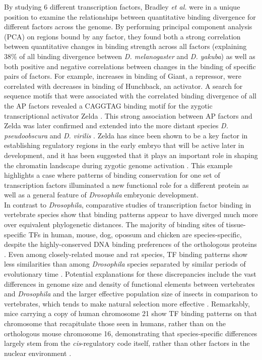 By studying 6 different transcription factors, Bradley \emph{et al.} were in a unique position to examine the relationships between quantitative binding divergence for different factors across the genome. By performing principal component analysis (PCA) on regions bound by any factor, they found both a strong correlation between quantitative changes in binding strength across all factors (explaining 38\% of all binding divergence between \emph{D. melanogaster} and \emph{D. yakuba}) as well as both positive and negative correlations between changes in the binding of specific pairs of factors. For example, increases in binding of Giant, a repressor, were correlated with decreases in binding of Hunchback, an activator. A search for sequence motifs that were associated with the correlated binding divergence of all the AP factors revealed a CAGGTAG binding motif for the zygotic transcriptional activator Zelda \citep{bradley_binding_2010}. This strong association between AP factors and Zelda was later confirmed and extended into the more distant species \emph{D. pseudoobscura} and \emph{D. virilis} \citep{paris_extensive_2013}. Zelda has since been shown to be a key factor in establishing regulatory regions in the early embryo that will be active later in development, and it has been suggested that it plays an important role in shaping the chromatin landscape during zygotic genome activation \citep{harrison_zelda_2011,satija_tagteam_2012}. This example highlights a case where patterns of binding conservation for one set of transcription factors illuminated a new functional role for a different protein as well as a general feature of \emph{Drosophila} embryonic development.\\

In contrast to \emph{Drosophila}, comparative studies of transcription factor binding in vertebrate species show that binding patterns appear to have diverged much more over equivalent phylogenetic distances. The majority of binding sites of tissue-specific TFs in human, mouse, dog, opossum and chicken are species-specific, despite the highly-conserved DNA binding preferences of the orthologous proteins \citep{odom_tissue-specific_2007,schmidt_five-vertebrate_2010}. Even among closely-related mouse and rat species, TF binding patterns show less similarities than among \emph{Drosophila} species separated by similar periods of evolutionary time \citep{stefflova_cooperativity_2013}. Potential explanations for these discrepancies include the vast differences in genome size and density of functional elements between vertebrates and \emph{Drosophila} and the larger effective population size of insects in comparison to vertebrates, which tends to make natural selection more effective \citep{villar_evolution_2014}. Remarkably, mice carrying a copy of human chromosome 21 show TF binding patterns on that chromosome that recapitulate those seen in humans, rather than on the orthologous mouse chromosome 16, demonstrating that species-specific differences largely stem from the \emph{cis}-regulatory code itself, rather than other factors in the nuclear environment \citep{wilson_species-specific_2008}.\\

